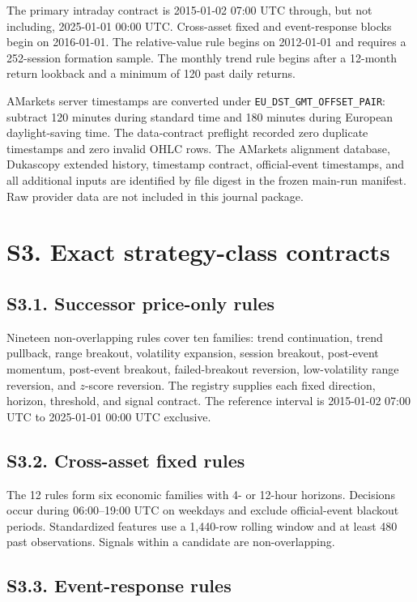 \documentclass[a4paper,fleqn]{cas-sc}
\begin{document}
The primary intraday contract is 2015-01-02 07:00 UTC through, but not including, 2025-01-01 00:00 UTC. Cross-asset fixed and event-response blocks begin on 2016-01-01. The relative-value rule begins on 2012-01-01 and requires a 252-session formation sample. The monthly trend rule begins after a 12-month return lookback and a minimum of 120 past daily returns.

AMarkets server timestamps are converted under \texttt{EU\_DST\_GMT\_OFFSET\_PAIR}: subtract 120 minutes during standard time and 180 minutes during European daylight-saving time. The data-contract preflight recorded zero duplicate timestamps and zero invalid OHLC rows. The AMarkets alignment database, Dukascopy extended history, timestamp contract, official-event timestamps, and all additional inputs are identified by file digest in the frozen main-run manifest. Raw provider data are not included in this journal package.

\section*{S3. Exact strategy-class contracts}

\subsection*{S3.1. Successor price-only rules}

Nineteen non-overlapping rules cover ten families: trend continuation, trend pullback, range breakout, volatility expansion, session breakout, post-event momentum, post-event breakout, failed-breakout reversion, low-volatility range reversion, and $z$-score reversion. The registry supplies each fixed direction, horizon, threshold, and signal contract. The reference interval is 2015-01-02 07:00 UTC to 2025-01-01 00:00 UTC exclusive.

\subsection*{S3.2. Cross-asset fixed rules}

The 12 rules form six economic families with 4- or 12-hour horizons. Decisions occur during 06:00--19:00 UTC on weekdays and exclude official-event blackout periods. Standardized features use a 1,440-row rolling window and at least 480 past observations. Signals within a candidate are non-overlapping.

\subsection*{S3.3. Event-response rules}
\end{document}
